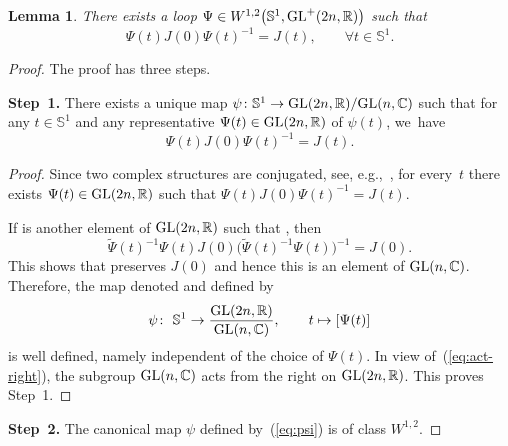 \documentclass[pdftex]{sigma}
\numberwithin{equation}{section}
\newtheorem{Lemma}[Theorem]{Lemma}
\newcommand{\C}{{\mathbb{C}}}
\newcommand{\R}{{\mathbb{R}}}
\renewcommand{\SS}{{\mathbb{S}}}
\newcommand{\GL}{{\rm GL}}
\newcommand{\1}{{{\mathchoice {\rm 1\mskip-4mu l} {\rm 1\mskip-4mu l}
{\rm 1\mskip-4.5mu l} {\rm 1\mskip-5mu l}}}}
\begin{document}
\begin{Lemma}\label{le:loop-exists}
There exists a loop $\Psi\in W^{1,2}\bigl(\SS^1, \GL^+(2n,\R)\bigr)$ such that
\begin{equation}\label{eq:hghgj775800}
 \Psi(t)J(0)\Psi(t)^{-1}=J(t)
 ,\qquad
 \forall t\in\SS^1 .
\end{equation}
\end{Lemma}

\begin{proof}
The proof has three steps.


\medskip\noindent
\textbf{Step~1.}
There exists a unique map
$
 \psi\colon\SS^1\to \GL(2n,\R)/\GL(n,\C)
$
such that for any $t\in\SS^1$ and any representative
$\Psi(t)\in \GL(2n,\R)$ of $\psi(t)$, we~have
\begin{equation}\label{eq:act-right}
 \Psi(t)J(0)\Psi(t)^{-1}=J(t) .
\end{equation}

\begin{proof}
Since two complex structures are conjugated,
see, e.g.,~\cite[Proposition~2.5.1]{mcduff:2004a},
for every~$t$ there exists $\Psi(t)\in \GL(2n,\R)$ such that
$\Psi(t)J(0)\Psi(t)^{-1}=J(t)$.

If  is another element of $\GL(2n,\R)$ such that
, then
\[
 \tilde\Psi(t)^{-1}\Psi(t) J(0)\bigl(\tilde\Psi(t)^{-1}\Psi(t)\bigr)^{-1}
 =J(0) .
\]
This shows that  preserves $J(0)$ and
hence this is an element of $\GL(n,\C)$.
Therefore, the map denoted and defined by
\begin{equation}\label{eq:psi}
 \psi\colon\
 \SS^1\to\frac{\GL(2n,\R)}{\GL(n,\C)}
 ,\qquad
 t\mapsto [\Psi(t)]
\end{equation}
is well defined, namely independent of the choice of $\Psi(t)$.
In view of~(\ref{eq:act-right}),
the subgroup $\GL(n,\C)$ acts from the right on $\GL(2n,\R)$.
This proves Step~1.
\end{proof}

\noindent
\textbf{Step~2.}
The canonical map $\psi$ defined by~(\ref{eq:psi})
is of class $W^{1,2}$.


\end{proof}
\end{document}
